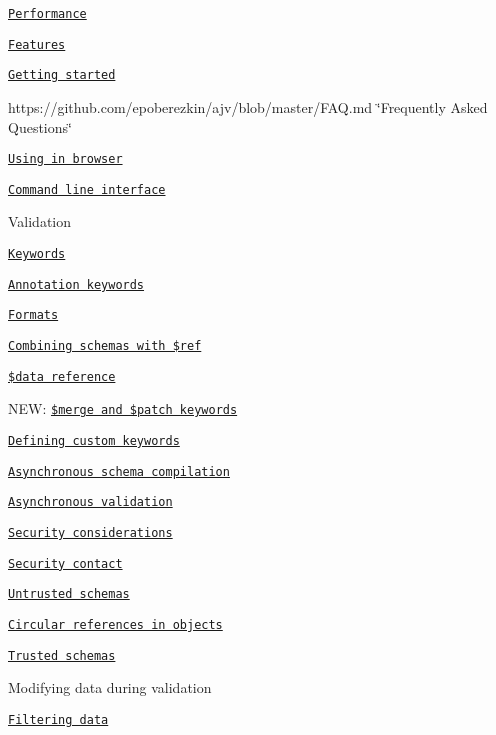 \begin{DoxyItemize}
\item \href{#performance}{\tt Performance}
\item \href{#features}{\tt Features}
\item \href{#getting-started}{\tt Getting started}
\item https\+://github.com/epoberezkin/ajv/blob/master/\+F\+A\+Q.\+md \char`\"{}\+Frequently Asked Questions\char`\"{}
\item \href{#using-in-browser}{\tt Using in browser}
\item \href{#command-line-interface}{\tt Command line interface}
\item Validation
\begin{DoxyItemize}
\item \href{#validation-keywords}{\tt Keywords}
\item \href{#annotation-keywords}{\tt Annotation keywords}
\item \href{#formats}{\tt Formats}
\item \href{#ref}{\tt Combining schemas with \$ref}
\item \href{#data-reference}{\tt \$data reference}
\item N\+EW\+: \href{#merge-and-patch-keywords}{\tt \$merge and \$patch keywords}
\item \href{#defining-custom-keywords}{\tt Defining custom keywords}
\item \href{#asynchronous-schema-compilation}{\tt Asynchronous schema compilation}
\item \href{#asynchronous-validation}{\tt Asynchronous validation}
\end{DoxyItemize}
\item \href{#security-considerations}{\tt Security considerations}
\begin{DoxyItemize}
\item \href{#security-contact}{\tt Security contact}
\item \href{#untrusted-schemas}{\tt Untrusted schemas}
\item \href{#circular-references-in-javascript-objects}{\tt Circular references in objects}
\item \href{#security-risks-of-trusted-schemas}{\tt Trusted schemas}
\end{DoxyItemize}
\item Modifying data during validation
\begin{DoxyItemize}
\item \href{#filtering-data}{\tt Filtering data}

\end{DoxyItemize}
\end{DoxyItemize}
